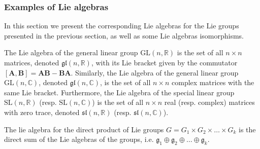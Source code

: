 \subsubsection{Examples of Lie algebras}
In this section we present the corresponding Lie algebras for the Lie groups presented in the previous section, as well as some Lie algebras isomorphisms.
\begin{example}
    The Lie algebra of the general linear group $\text{GL}(n, \mathbb{R})$ is the set of all $n\times n$ matrices, denoted $\mathfrak{gl}(n, \mathbb{R})$, with its Lie bracket given by the commutator $[\mathbf{A}, \mathbf{B}] = \mathbf{A}\mathbf{B} - \mathbf{B}\mathbf{A}$. Similarly, the Lie algebra of the general linear group $\text{GL}(n, \mathbb{C})$, denoted $\mathfrak{gl}(n, \mathbb{C})$, is the set of all $n\times n$ complex matrices with the same Lie bracket. Furthermore, the Lie algebra of the special linear group $\text{SL}(n, \mathbb{R})$ (resp. $\text{SL}(n, \mathbb{C})$) is the set of all $n\times n$ real (resp. complex) matrices with zero trace, denoted $\mathfrak{sl}(n, \mathbb{R})$ (resp. $\mathfrak{sl}(n, \mathbb{C})$).
\end{example}
\begin{example}
    The lie algebra for the direct product of Lie groups $G=G_1 \times G_2 \times \dots \times G_k$ is the direct sum of the Lie algebras of the groups, i.e. $\mathfrak{g}_1\oplus\mathfrak{g}_2\oplus\dots\oplus\mathfrak{g}_k$.
\end{example}
